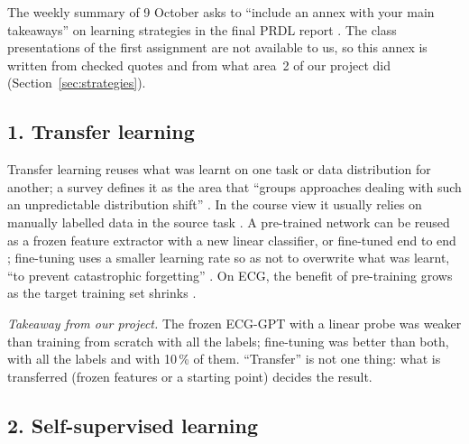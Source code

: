 \label{app:strategies}

The weekly summary of 9 October asks to ``include an annex with your main takeaways'' on learning
strategies in the final PRDL report \cite{course_summary_0910}. The class presentations of the first
assignment are not available to us, so this annex is written from checked quotes and from what area~2 of
our project did (Section~\ref{sec:strategies}).

\subsection*{1. Transfer learning}

Transfer learning reuses what was learnt on one task or data distribution for another; a survey defines
it as the area that ``groups approaches dealing with such an unpredictable distribution shift''
\cite[p.~2]{monka2022survey}. In the course view it usually relies on manually labelled data in the source
task \cite{course_summary_0910}. A pre-trained network can be reused as a frozen feature extractor with a
new linear classifier, or fine-tuned end to end \cite[p.~11]{radford2021learning}; fine-tuning uses a smaller
learning rate so as not to overwrite what was learnt, ``to prevent catastrophic forgetting''
\cite[p.~6]{soltanieh2023indistribution}. On ECG, the benefit of pre-training grows as the target training set
shrinks \cite[p.~1524]{strodthoff2021deep}.

\emph{Takeaway from our project.} The frozen ECG-GPT with a linear probe was weaker than training from
scratch with all the labels; fine-tuning was better than both, with all the labels and with 10\,\% of
them. ``Transfer'' is not one thing: what is transferred (frozen features or a starting point) decides the
result.

\subsection*{2. Self-supervised learning}

